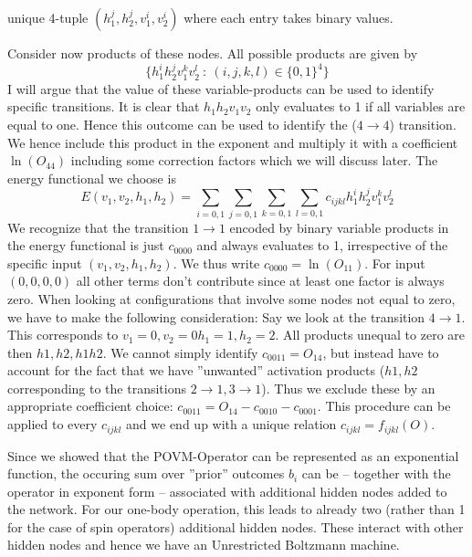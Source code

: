 \documentclass{article}
\begin{document}
unique 4-tuple $(h^j_1,h^j_2, v^i_1,v^i_2)$ where each entry takes binary
values.  \par
Consider now products of these nodes. All possible products are given by
\begin{equation}
    \{ h_1^i h_2^j v_1^k v_2^l \: : \: (i,j,k,l)\in \{0,1\}^4 \}
\end{equation}
I will argue that the value of these variable-products can be used to identify
specific transitions. It is clear that $h_1h_2v_1v_2$ only evaluates to 1 if all
variables are equal to one. Hence this outcome can be used to identify the
($4\rightarrow4$) transition. We hence include this product in the exponent and
multiply it with a coefficient $\ln{(O_{44})}$ including some correction factors
which we will discuss later. The energy functional we choose is
\begin{equation}
    E(v_1,v_2,h_1,h_2) = \sum_{i=0,1}\sum_{j=0,1}\sum_{k=0,1}\sum_{l=0,1}
                         c_{ijkl}h_1^i h_2^j v_1^k v_2^l
\end{equation}
We recognize that the transition $1\rightarrow1$ encoded by binary variable
products in the energy functional is just $c_{0000}$ and always evaluates to 1,
irrespective of the specific input $(v_1,v_2,h_1,h_2)$. We thus write
$c_{0000}=\ln(O_{11})$. For input $(0,0,0,0)$ all other terms don't contribute
since at least one factor is always zero. When looking at configurations that
involve some nodes not equal to zero, we have to make the following consideration:
Say we look at the transition $4\rightarrow1$. This corresponds to $v_1=0,v_2=0
h_1=1,h_2=2$. All products unequal to zero are then $h1, h2, h1h2$. We cannot
simply identify $c_{0011} = O_{14}$, but instead have to account for the fact
that we have ''unwanted'' activation products ($h1,h2$ corresponding to the
transitions $2\rightarrow1, 3\rightarrow1$). Thus we exclude these by an
appropriate coefficient choice: $c_{0011} = O_{14} - c_{0010} - c_{0001}$. This
procedure can be applied to every $c_{ijkl}$ and we end up with a unique relation
$c_{ijkl} = f_{ijkl}(O)$. \par
Since we showed that the POVM-Operator can be represented as an exponential
function, the occuring sum over ''prior'' outcomes $b_i$ can be -- together with
the operator in exponent form -- associated with additional hidden nodes added
to the network. For our one-body operation, this leads to already two (rather
than 1 for the case of spin operators) additional hidden nodes. These interact
with other hidden nodes and hence we have an Unrestricted Boltzmann machine.
\end{document}
